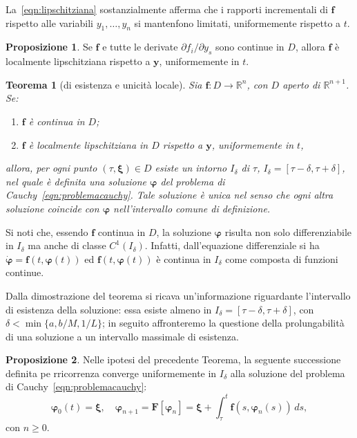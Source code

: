 \documentclass[a4paper]{book}
\numberwithin{equation}{section}
\renewcommand{\phi}{\varphi}
\theoremstyle{plain}
\newtheorem{teor}{Teorema}[section]
\theoremstyle{definition}
\newtheorem{prop}{Proposizione}[section]
\theoremstyle{remark}
\renewcommand{\vec}{\boldsymbol}
\theoremstyle{example}
\begin{document}
	La~\eqref{eqn:lipschitziana} sostanzialmente afferma che i rapporti incrementali di $\vec{f}$ rispetto alle variabili $y_1, \dots, y_n$ si mantenfono limitati, uniformemente rispetto a $t$.

		\begin{prop}
			Se $\vec{f}$ e tutte le derivate $\partial f_i / \partial y_s$ sono continue in $D$, allora $\vec{f}$ è localmente lipschitziana rispetto a $\vec{y}$, uniformemente in $t$.
		\end{prop}

		\begin{teor}[di esistenza e unicità locale]
			\label{teor:esistunicloc}
			 Sia $\vec{f} \colon D \to \mathbb{R}^n$, con $D$ aperto di $\mathbb{R}^{n+1}$. Se:
				\begin{enumerate}
					\item $\vec{f}$ è continua in $D$;
					\item $\vec{f}$ è localmente lipschitziana in $D$ rispetto a $\vec{y}$, uniformemente in $t$,
				\end{enumerate}
		allora, per ogni punto $(\tau, \vec{\xi}) \in D$ esiste un intorno $I_{\delta}$ di $\tau$, $I_{\delta} = [\tau - \delta, \tau + \delta]$, nel quale è definita una soluzione $\vec{\phi}$ del problema di Cauchy~\eqref{eqn:problemacauchy}. Tale soluzione è unica nel senso che ogni altra soluzione coincide con $\vec{\phi}$ nell'intervallo comune di definizione.
			\end{teor}

			Si noti che, essendo $\vec{f}$ continua in $D$, la soluzione $\vec{\phi}$ risulta non solo differenziabile in $I_{\delta}$ ma anche di classe $C^1(I_{\delta})$. Infatti, dall'equazione differenziale si ha $\dot{\vec{\phi}}=\vec{f}(t, \vec{\phi}(t))$ ed $\vec{f}(t, \vec{\phi}(t))$ è continua in $I_{\delta}$ come composta di funzioni continue.

			Dalla dimostrazione del teorema si ricava un'informazione riguardante l'intervallo di esistenza della soluzione: essa esiste almeno in $I_{\delta} = [\tau - \delta, \tau + \delta]$, con $\delta < \min\{a, b/M, 1/L\}$; in seguito affronteremo la questione della prolungabilità di una soluzione a un intervallo massimale di esistenza.

			\begin{prop}
				Nelle ipotesi del precedente Teorema, la seguente successione definita pe rricorrenza converge uniformemente in $I_{\delta}$ alla soluzione del problema di Cauchy~\eqref{eqn:problemacauchy}:
					\begin{equation}
						\vec{\phi}_0(t) = \vec{\xi}, \quad \vec{\phi}_{n+1} = \vec{F}[\vec{\phi}_n] = \vec{\xi} + \int_{\tau}^t \vec{f}(s, \vec{\phi}_n(s))\,ds,
					\end{equation}
				con $n \ge 0$.
			\end{prop}
\end{document}
